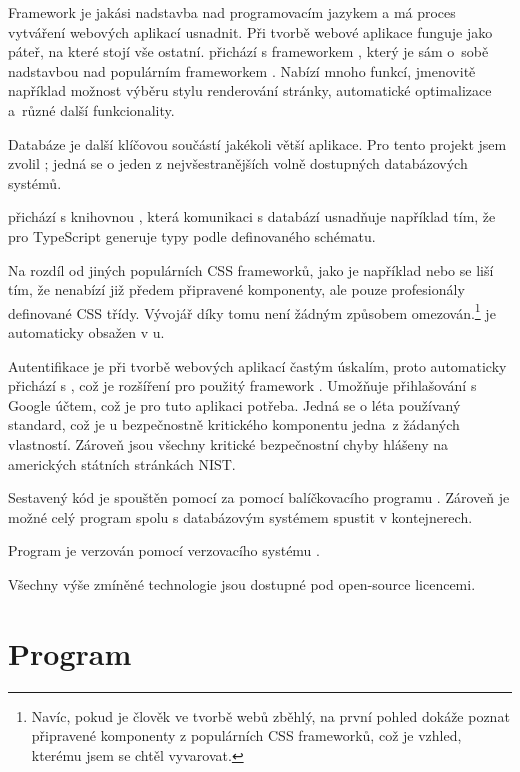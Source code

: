 Framework je jakási nadstavba nad programovacím jazykem a má proces vytváření webových aplikací usnadnit. Při tvorbě webové aplikace funguje jako páteř, na které stojí vše ostatní.  přichází s frameworkem , který je sám o~sobě nadstavbou nad populárním frameworkem . Nabízí mnoho funkcí, jmenovitě například možnost výběru stylu renderování stránky, automatické optimalizace a~různé další funkcionality.\cite{nextjs}


Databáze je další klíčovou součástí jakékoli větší aplikace. Pro tento projekt jsem zvolil ; jedná se o jeden z nejvšestranějších volně dostupných databázových systémů.

 přichází s knihovnou , která komunikaci s databází usnadňuje například tím, že pro TypeScript generuje typy podle definovaného schématu.

Na rozdíl od jiných populárních CSS frameworků, jako je například  nebo  se  liší tím, že nenabízí již předem připravené komponenty, ale pouze profesionály definované CSS třídy. Vývojář díky tomu není žádným způsobem omezován.\footnote{Navíc, pokud je člověk ve tvorbě webů zběhlý, na první pohled dokáže poznat připravené komponenty z populárních CSS  frameworků, což je vzhled, kterému jsem se chtěl vyvarovat.}\cite{tailwind}  je automaticky obsažen v u.

Autentifikace je při tvorbě webových aplikací častým úskalím, proto  automaticky přichází s , což je rozšíření pro použitý framework . Umožňuje přihlašování s Google účtem, což je pro tuto aplikaci potřeba. Jedná se o léta používaný standard, což je u bezpečnostně kritického komponentu jedna~z žádaných vlastností. Zároveň jsou všechny kritické bezpečnostní chyby hlášeny na amerických státních stránkách NIST.

Sestavený kód je spouštěn pomocí  za pomocí balíčkovacího programu . Zároveň je možné celý program spolu s databázovým systémem spustit v  kontejnerech.

Program je verzován pomocí verzovacího systému .

Všechny výše zmíněné technologie jsou dostupné pod open-source licencemi.

\section{Program}


